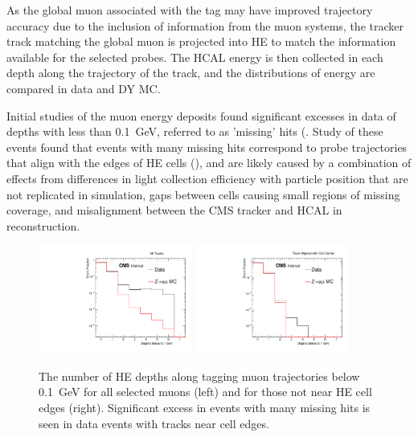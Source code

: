 As the global muon associated with the tag may have improved trajectory accuracy due to the inclusion of information from the muon systems, the tracker track matching the global muon is projected into HE to match the information available for the selected probes.
The HCAL energy is then collected in each depth along the trajectory of the track, and the distributions of energy are compared in data and DY MC. 

Initial studies of the muon energy deposits found significant excesses in data of depths with less than \SI{0.1}{\giga\eV}, referred to as 'missing' hits (. 
Study of these events found that events with many missing hits correspond to probe trajectories that align with the edges of HE cells (), and are likely caused by a combination of effects from differences in light collection efficiency with particle position that are not replicated in simulation, gaps between cells causing small regions of missing coverage, and misalignment between the CMS tracker and HCAL in reconstruction.

\begin{figure}[ht]
	\centering
	\includegraphics[width=0.45\textwidth]{figures/hcalAllMissingHits.pdf}
        \hspace{0.01\textwidth}
        \includegraphics[width=0.45\textwidth]{figures/hcalMissingHits.pdf}
        \caption[Missing muon hits in HE]{The number of HE depths along tagging muon trajectories below \SI{0.1}{\giga\eV} for all selected muons (left) and for those not near HE cell edges (right). Significant excess in events with many missing hits is seen in data events with tracks near cell edges.}
        \label{fig:missingHits}
\end{figure}


